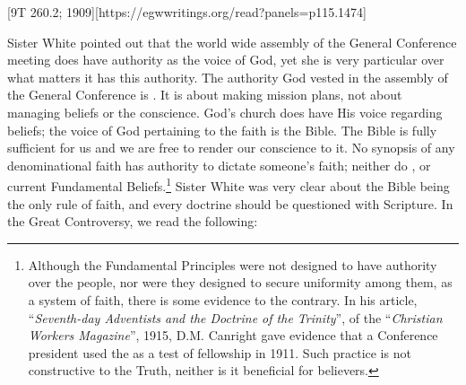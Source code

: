 [9T 260.2; 1909][https://egwwritings.org/read?panels=p115.1474]


Sister White pointed out that the world wide assembly of the General Conference meeting does have authority as the voice of God, yet she is very particular over what matters it has this authority. The authority God vested in the assembly of the General Conference is . It is about making mission plans, not about managing beliefs or the conscience. God’s church does have His voice regarding beliefs; the voice of God pertaining to the faith is the Bible. The Bible is fully sufficient for us and we are free to render our conscience to it. No synopsis of any denominational faith has authority to dictate someone's faith; neither do , or current Fundamental Beliefs.\footnote{Although the Fundamental Principles were not designed to have authority over the people, nor were they designed to secure uniformity among them, as a system of faith, there is some evidence to the contrary. In his article, “\textit{Seventh-day Adventists and the Doctrine of the Trinity}”, of the “\textit{Christian Workers Magazine}”, 1915, D.M. Canright gave evidence that a Conference president used the  as a test of fellowship in 1911. Such practice is not constructive to the Truth, neither is it beneficial for believers.} Sister White was very clear about the Bible being the only rule of faith, and every doctrine should be questioned with Scripture. In the Great Controversy, we read the following:


